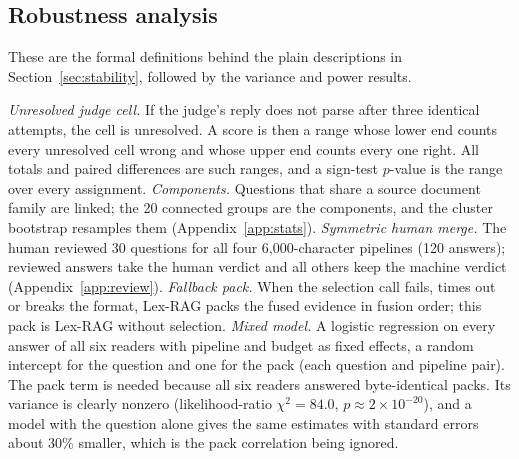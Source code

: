 \subsection{Robustness analysis}
\label{app:variance}
These are the formal definitions behind the plain descriptions in Section~\ref{sec:stability}, followed by the variance and power results.

\emph{Unresolved judge cell.} If the judge's reply does not parse after three identical attempts, the cell is unresolved. A score is then a range whose lower end counts every unresolved cell wrong and whose upper end counts every one right. All totals and paired differences are such ranges, and a sign-test $p$-value is the range over every assignment. \emph{Components.} Questions that share a source document family are linked; the 20 connected groups are the components, and the cluster bootstrap resamples them (Appendix~\ref{app:stats}). \emph{Symmetric human merge.} The human reviewed 30 questions for all four 6,000-character pipelines (120 answers); reviewed answers take the human verdict and all others keep the machine verdict (Appendix~\ref{app:review}). \emph{Fallback pack.} When the selection call fails, times out or breaks the format, Lex-RAG packs the fused evidence in fusion order; this pack is Lex-RAG without selection. \emph{Mixed model.} A logistic regression on every answer of all six readers with pipeline and budget as fixed effects, a random intercept for the question and one for the pack (each question and pipeline pair). The pack term is needed because all six readers answered byte-identical packs. Its variance is clearly nonzero (likelihood-ratio $\chi^2=84.0$, $p\approx 2\times10^{-20}$), and a model with the question alone gives the same estimates with standard errors about 30\% smaller, which is the pack correlation being ignored.

